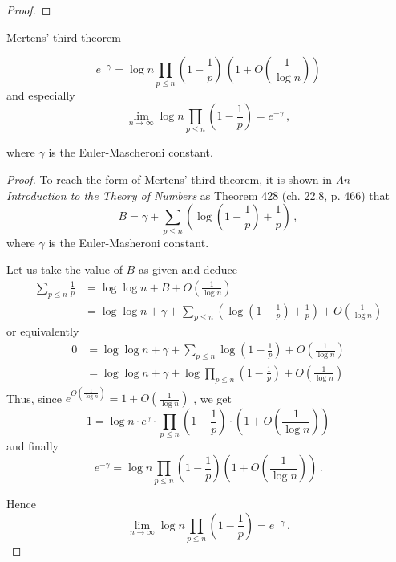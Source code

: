 \documentclass{article}
\begin{document}
\begin{theorem}
\begin{proof}
\end{proof}

\end{theorem}

\begin{theorem}
Mertens' third theorem
\label{thm:mertens3}

\begin{equation*}
    e^{-\gamma} = \log n \prod_{p\le n} \left(1-\frac{1}{p}\right)\,\left(1+O\left(\frac{1}{\log n}\right)\right)
\end{equation*}
and especially
\begin{equation*}
    \lim_{n \rightarrow \infty} \log n \prod_{p\leq n} \left(1-\frac{1}{p}\right) = e^{-\gamma}\,,
\end{equation*}

where $\gamma$ is the Euler-Mascheroni constant.

\begin{proof}
To reach the form of Mertens' third theorem, it is shown in \textit{An Introduction to the Theory of Numbers} \cite{HardyWright} as Theorem 428 (ch. 22.8, p. 466) that
\begin{equation*}
    B = \gamma + \sum_{p\leq n} \left(\log \left(1-\frac{1}{p}\right)+\frac{1}{p}\right)\,,
\end{equation*}
where $\gamma$ is the Euler-Masheroni constant.

Let us take the value of $B$ as given and deduce
\begin{align*}
    \sum_{p\leq n} \frac{1}{p} & = \log\log n + B + O\left(\frac{1}{\log n}\right)\\
    & = \log\log n + \gamma + \sum_{p\leq n} \left(\log \left(1-\frac{1}{p}\right)+\frac{1}{p}\right) + O\left(\frac{1}{\log n}\right)
\end{align*}
or equivalently
\begin{align*}
    0 & = \log\log n + \gamma + \sum_{p\leq n} \log \left(1-\frac{1}{p}\right) + O\left(\frac{1}{\log n}\right)\\
    & = \log\log n + \gamma + \log \prod_{p\leq n} \left(1-\frac{1}{p}\right) + O\left(\frac{1}{\log n}\right)
\end{align*}
Thus, since $e^{O\left(\frac{1}{\log n}\right)}=1+O\left(\frac{1}{\log n}\right)$ \cite[p. 9]{Rosen}, we get
\begin{equation*}
    1 = \log n \cdot e^\gamma \cdot \prod_{p\leq n} \left(1-\frac{1}{p}\right) \cdot \left(1+O\left(\frac{1}{\log n}\right)\right)
\end{equation*}
and finally
\begin{equation*}
    e^{-\gamma} = \log n \prod_{p\le n} \left(1-\frac{1}{p}\right) \left(1+O\left(\frac{1}{\log n}\right)\right)\,.
\end{equation*}

Hence
\begin{equation*}
    \lim_{n \rightarrow \infty} \log n \prod_{p\leq n} \left(1-\frac{1}{p}\right) = e^{-\gamma}\,.
\end{equation*}
\end{proof}

\end{theorem}
\end{document}

